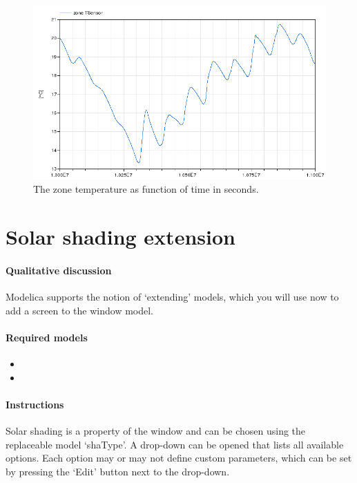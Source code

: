 \documentclass[10pt,a4paper]{article}
\begin{document}
\begin{figure}
\centering
\includegraphics[scale=0.7]{Example1.png}
\caption{The zone temperature as function of time in seconds.}
\label{fig:res1}
\end{figure}


\section{Solar shading extension}
\paragraph{Qualitative discussion}
Modelica supports the notion of `extending' models, which you will
use now to add a screen to the window model.


\paragraph{Required models}
\begin{itemize}
\item {}
\item {}
\end{itemize}

\paragraph{Instructions}
Solar shading is a property of the window and can be chosen using the 
replaceable model `shaType'. 
A drop-down can be opened that lists all available options.
Each option may or may not define custom parameters,
which can be set by pressing the `Edit' button next to the drop-down.
\end{document}
